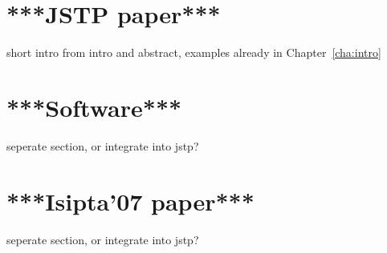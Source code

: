 \section{***JSTP paper***}
\label{sec:jstp}

short intro from intro and abstract, examples already in Chapter~\ref{cha:intro}



\section{***Software***}

seperate section, or integrate into jstp?

\section{***Isipta'07 paper***}

seperate section, or integrate into jstp?

